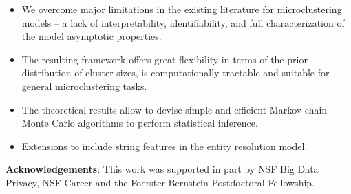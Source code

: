 \documentclass[portrait,a0b,final]{a0poster}
\newenvironment{poster}{
  \begin{center}
  \begin{minipage}[c]{0.98\textwidth}
}{
  \end{minipage}
  \end{center}
}
\newcommand{\pbox}[4]{
\psshadowbox[#3]{
\begin{minipage}[t][#2][t]{#1}
#4
\end{minipage}
}}
\begin{document}
\begin{poster}
\begin{multicols}{3}
\vspace{.25cm}\begin{center}\pbox{0.8\columnwidth}{}{linewidth=2mm,framearc=0.1,linecolor=lightblue,
fillstyle=gradient,gradangle=0,gradbegin=white,gradend=whiteblue,gradmidpoint=1.0,framesep=1em}
{\begin{center}{\large \bf Discussion}\end{center}}\end{center}
\vspace*{1em}

\begin{itemize}
\item We overcome major limitations in the existing literature for microclustering models -- a lack of interpretability, identifiability, and full characterization of the model asymptotic properties.
\item The resulting framework offers great flexibility in terms
of the prior distribution of cluster sizes, is computationally tractable and suitable
for general microclustering tasks. 
\item The theoretical results
allow to devise simple and efficient Markov chain Monte Carlo algorithms to perform
statistical inference. 
\item Extensions to include string features in the entity resolution model.
\end{itemize}

\textbf{Acknowledgements}: This work was supported in
part by NSF Big Data Privacy, NSF Career and the
Foerster-Bernstein Postdoctoral Fellowship.

\scriptsize{


}
\phantom{.}
\end{multicols}



\end{poster}
\end{document}
